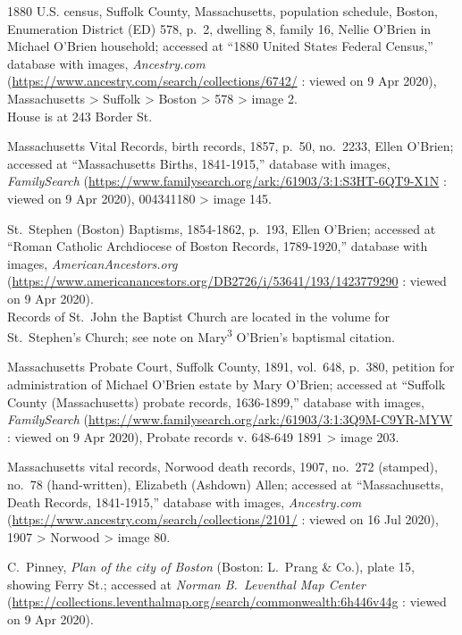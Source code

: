 \begin{thebibliography}{999}
	1880 U.S. census, Suffolk County, Massachusetts, population schedule, Boston, Enumeration District (ED) 578, p.\ 2, dwelling 8, family 16, Nellie O'Brien in Michael O'Brien household; accessed at ``1880 United States Federal Census,'' database with images, \textit{Ancestry.com} (\url{https://www.ancestry.com/search/collections/6742/} : viewed on 9 Apr 2020), Massachusetts > Suffolk > Boston > 578 > image 2.\\
	House is at 243 Border St.
	
	Massachusetts Vital Records, birth records, 1857, p.\ 50, no.\ 2233, Ellen O'Brien; accessed at ``Massachusetts Births, 1841-1915,'' database with images, \textit{FamilySearch} (\url{https://www.familysearch.org/ark:/61903/3:1:S3HT-6QT9-X1N} : viewed on 9 Apr 2020), 004341180 > image 145.
	
	St.\ Stephen (Boston) Baptisms, 1854-1862, p.\ 193, Ellen O'Brien; accessed at ``Roman Catholic Archdiocese of Boston Records, 1789-1920,'' database with images, \textit{AmericanAncestors.org} (\url{https://www.americanancestors.org/DB2726/i/53641/193/1423779290} : viewed on 9 Apr 2020).\\
	Records of St.\ John the Baptist Church are located in the volume for St.\ Stephen's Church; see note on Mary\textsuperscript{3} O'Brien's baptismal citation.
	
	Massachusetts Probate Court, Suffolk County, 1891, vol.\ 648, p.\ 380, petition for administration of Michael O'Brien estate by Mary O'Brien; accessed at ``Suffolk County (Massachusetts) probate records, 1636-1899,'' database with images, \textit{FamilySearch} (\url{https://www.familysearch.org/ark:/61903/3:1:3Q9M-C9YR-MYW} : viewed on 9 Apr 2020), Probate records v. 648-649 1891 > image 203.
	
	Massachusetts vital records, Norwood death records, 1907, no.\ 272 (stamped), no.\ 78 (hand-written), Elizabeth (Ashdown) Allen; accessed at ``Massachusetts, Death Records, 1841-1915,'' database with images, \textit{Ancestry.com} (\url{https://www.ancestry.com/search/collections/2101/} : viewed on 16 Jul 2020), 1907 > Norwood > image 80.
	
	C.\ Pinney, \textit{Plan of the city of Boston} (Boston: L.\ Prang \& Co.), plate 15, showing Ferry St.; accessed at \textit{Norman B.\ Leventhal Map Center} (\url{https://collections.leventhalmap.org/search/commonwealth:6h446v44g} : viewed on 9 Apr 2020).	
	

\end{thebibliography}
